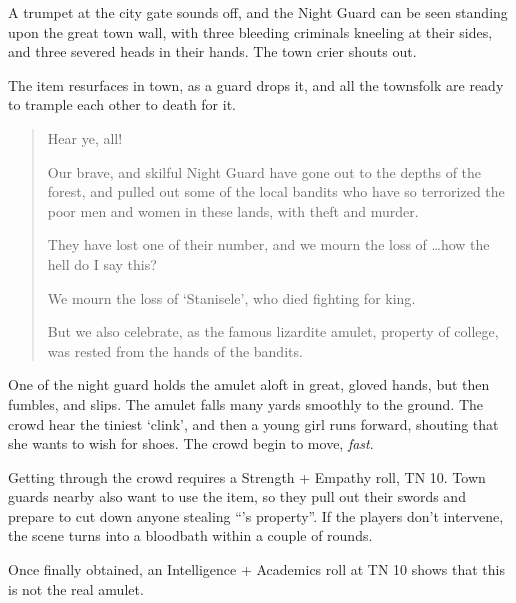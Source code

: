 \begin{multicols}{2}
\begin{boxtext}

	A trumpet at the city gate sounds off, and the Night Guard can be seen standing upon the great town wall, with three bleeding criminals kneeling at their sides, and three severed heads in their hands.  The town crier shouts out.

\end{boxtext}

The item resurfaces in town, as a guard drops it, and all the townsfolk are ready to trample each other to death for it.

\begin{boxtext}
	\begin{quotation}
		Hear ye, all!

		Our brave, and skilful Night Guard have gone out to the depths of the forest, and pulled out some of the local bandits who have so terrorized the poor men and women in these lands, with theft and murder.

		They have lost one of their number, and we mourn the loss of \ldots how the hell do I say this?

		We mourn the loss of `Stanisele', who died fighting for \gls{king}.

		But we also celebrate, as the famous lizardite amulet, property of \gls{college}, was rested from the hands of the bandits.

	\end{quotation}

	One of the night guard holds the amulet aloft in great, gloved hands, but then fumbles, and slips.  The amulet falls many yards smoothly to the ground.  The crowd hear the tiniest `clink', and then a young girl runs forward, shouting that she wants to wish for shoes.  The crowd begin to move, \emph{fast}.

\end{boxtext}

Getting through the crowd requires a Strength + Empathy roll, TN 10.
Town guards nearby also want to use the item, so they pull out their swords and prepare to cut down anyone stealing ``'s property''.
If the players don't intervene, the scene turns into a bloodbath within a couple of rounds.

Once finally obtained, an Intelligence + Academics roll at TN 10 shows that this is not the real amulet.



\end{multicols}
